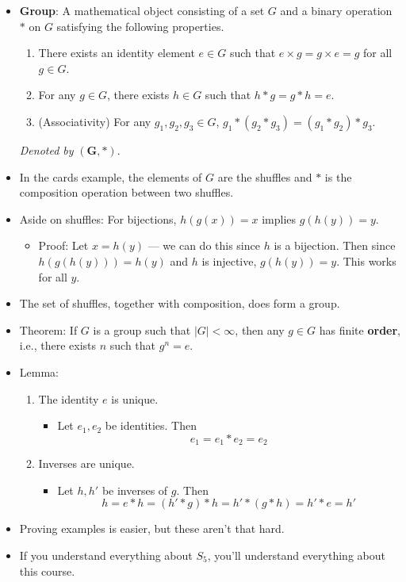 \documentclass[../notes.tex]{subfiles}
\begin{document}
\begin{itemize}
    \item \textbf{Group}: A mathematical object consisting of a set $G$ and a binary operation $*$ on $G$ satisfying the following properties.
    \begin{enumerate}
        \item There exists an identity element $e\in G$ such that $e\times g=g\times e=g$ for all $g\in G$.
        \item For any $g\in G$, there exists $h\in G$ such that $h*g=g*h=e$.
        \item (Associativity) For any $g_1,g_2,g_3\in G$, $g_1*(g_2*g_3)=(g_1*g_2)*g_3$.
    \end{enumerate}
    \emph{Denoted by} $\bm{(G,*)}$.
    \item In the cards example, the elements of $G$ are the shuffles and $*$ is the composition operation between two shuffles.
    \item Aside on shuffles: For bijections, $h(g(x))=x$ implies $g(h(y))=y$.
    \begin{itemize}
        \item Proof: Let $x=h(y)$ --- we can do this since $h$ is a bijection. Then since $h(g(h(y)))=h(y)$ and $h$ is injective, $g(h(y))=y$. This works for all $y$.
    \end{itemize}
    \item The set of shuffles, together with composition, does form a group.
    \item Theorem: If $G$ is a group such that $|G|<\infty$, then any $g\in G$ has finite \textbf{order}, i.e., there exists $n$ such that $g^n=e$.
    \item Lemma:
    \begin{enumerate}
        \item The identity $e$ is unique.
        \begin{itemize}
            \item Let $e_1,e_2$ be identities. Then
            \begin{equation*}
                e_1 = e_1*e_2 = e_2
            \end{equation*}
        \end{itemize}
        \item Inverses are unique.
        \begin{itemize}
            \item Let $h,h'$ be inverses of $g$. Then
            \begin{equation*}
                h = e*h
                = (h'*g)*h
                = h'*(g*h)
                = h'*e
                = h'
            \end{equation*}
        \end{itemize}
    \end{enumerate}
    \item Proving examples is easier, but these aren't that hard.
    \item If you understand everything about $S_5$, you'll understand everything about this course.
\end{itemize}
\end{document}

